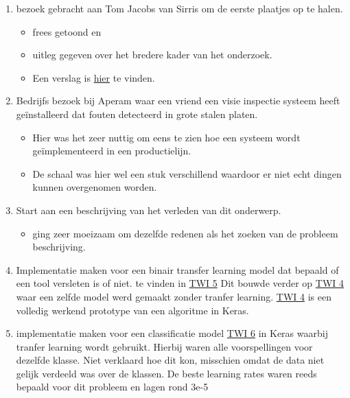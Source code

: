 \documentclass{scrartcl}
\begin{document}
\begin{enumerate}[1]
\item bezoek gebracht aan Tom Jacobs van Sirris om de eerste plaatjes op te halen. 
	\begin{itemize}
	\item frees getoond en 
	\item uitleg gegeven over het bredere kader van het onderzoek. 
	\item Een verslag is \href{./Activities/Masterproef_Tool_Wear_Inspection_-_Meeting1_TJ.tex}{hier} te vinden. 
	\end{itemize}
\item Bedrijfs bezoek bij Aperam waar een vriend een visie inspectie systeem heeft geïnstalleerd dat fouten detecteerd in grote stalen platen. 
	\begin{itemize}
	\item Hier was het zeer nuttig om eens te zien hoe een systeem wordt geïmplementeerd in een productielijn. 
	\item De schaal was hier wel een stuk verschillend waardoor er niet echt dingen kunnen overgenomen worden.
	\end{itemize}
\item Start aan een beschrijving van het verleden van dit onderwerp.
	\begin{itemize}
	\item ging zeer moeizaam om dezelfde redenen als het zoeken van de probleem beschrijving.
	\end{itemize}
\item Implementatie maken voor een binair transfer learning model dat bepaald of een tool versleten is of niet. te vinden in \href{https://colab.research.google.com/drive/1N2r6nplmx88pUOKkLN0Hmy42D7YRUypC}{TWI 5} Dit bouwde verder op \href{https://colab.research.google.com/drive/1Qsoj7WmGClsslivGGI4DGL10NNVdIHC2}{TWI 4} waar een zelfde model werd gemaakt zonder tranfer learning.  \href{https://colab.research.google.com/drive/1Qsoj7WmGClsslivGGI4DGL10NNVdIHC2}{TWI 4} is een volledig werkend prototype van een algoritme in Keras.
\item implementatie maken voor een classificatie model \href{https://colab.research.google.com/drive/1QN68qaE84fq9dBnZFNExsS5F8tZk-8Ow}{TWI 6} in Keras waarbij tranfer learning wordt gebruikt. Hierbij waren alle voorspellingen voor dezelfde klasse. Niet verklaard hoe dit kon, misschien omdat de data niet gelijk verdeeld was over de klassen. De beste learning rates waren reeds bepaald voor dit probleem en lagen rond 3e-5 
\end{enumerate}
\end{document}
